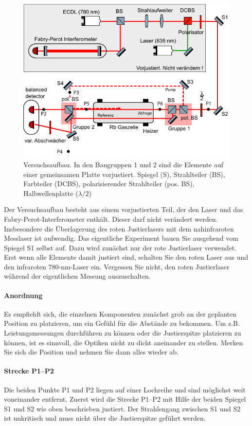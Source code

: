 \begin{figure}
   \includegraphics[width=\textwidth]{bilder/setup_rb.pdf}
   \caption{Versuchsaufbau. In den Baugruppen 1 und 2 sind die Elemente auf einer gemeinsamen Platte vorjustiert. Spiegel (S), Strahlteiler (BS), Farbteiler (DCBS), polarisierender Strahlteiler (pos. BS), Halbwellenplatte ($\lambda/2$) }
\end{figure}

Der Versuchsaufbau besteht aus einem vorjustierten Teil, der den Laser und das Fabry-Perot-Interferometer enthält. Dieser darf nicht verändert werden. Insbesondere die Überlagerung des roten Justierlasers mit dem nahinfraroten Messlaser ist aufwendig. Das eigentliche Experiment bauen Sie ausgehend vom Spiegel S1 selbst auf. Dazu wird zunächst nur der rote Justierlaser verwendet. Erst wenn alle Elemente damit justiert sind, schalten Sie den roten Laser aus und den infraroten 780-nm-Laser ein. Vergessen Sie nicht, den roten Justierlaser während der eigentlichen Messung auszuschalten.

\paragraph{Anordnung} Es empfiehlt sich, die einzelnen Komponenten zunächst grob an der geplanten Position zu platzieren, um ein Gefühl für die Abstände zu bekommen. Um z.B. Leistungsmessungen durchführen zu können oder die Justierspitze platzieren zu können, ist es sinnvoll, die Optiken nicht zu dicht aneinander zu stellen. Merken Sie sich die Position und nehmen Sie dann alles wieder ab.

\paragraph{Strecke P1--P2} Die beiden Punkte P1 und P2 liegen auf einer Lochreihe und sind möglichst weit voneinander entfernt. Zuerst wird die Strecke P1--P2 mit Hilfe der beiden Spiegel S1 und S2 wie oben beschrieben justiert. Der Strahlengang zwischen S1 und S2 ist unkritisch und muss nicht über die Justierspitze geführt werden. 

